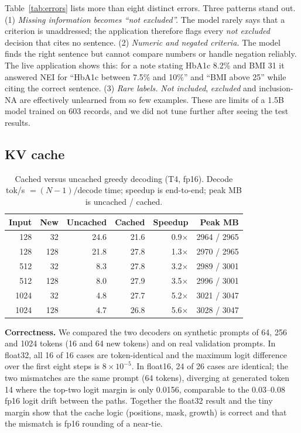\documentclass[conference]{IEEEtran}
\begin{document}
Table~\ref{tab:errors} lists more than eight distinct errors. Three patterns stand out. (1) \emph{Missing information becomes ``not excluded''.} The model rarely says that a criterion is unaddressed; the application therefore flags every \emph{not excluded} decision that cites no sentence. (2) \emph{Numeric and negated criteria.} The model finds the right sentence but cannot compare numbers or handle negation reliably. The live application shows this: for a note stating HbA1c 8.2\% and BMI 31 it answered NEI for ``HbA1c between 7.5\% and 10\%'' and ``BMI above 25'' while citing the correct sentence. (3) \emph{Rare labels.} \emph{Not included}, \emph{excluded} and inclusion-NA are effectively unlearned from so few examples. These are limits of a 1.5B model trained on 603 records, and we did not tune further after seeing the test results.

\subsection{KV cache}
\begin{table}[t]
\centering\footnotesize
\caption{Cached versus uncached greedy decoding (T4, fp16). Decode tok/s $=(N-1)/$decode time; speedup is end-to-end; peak MB is uncached / cached.}
\label{tab:kv}
\begin{tabular}{rrrrrr}\toprule
Input & New & Uncached & Cached & Speedup & Peak MB\\\midrule
128 & 32 & 24.6 & 21.6 & 0.9$\times$ & 2964 / 2965\\
128 & 128 & 21.8 & 27.8 & 1.3$\times$ & 2970 / 2965\\
512 & 32 & 8.3 & 27.8 & 3.2$\times$ & 2989 / 3001\\
512 & 128 & 8.0 & 27.9 & 3.5$\times$ & 2996 / 3001\\
1024 & 32 & 4.8 & 27.7 & 5.2$\times$ & 3021 / 3047\\
1024 & 128 & 4.7 & 26.8 & 5.6$\times$ & 3028 / 3047\\\bottomrule
\end{tabular}
\end{table}
\textbf{Correctness.} We compared the two decoders on synthetic prompts of 64, 256 and 1024 tokens (16 and 64 new tokens) and on real validation prompts. In float32, all 16 of 16 cases are token-identical and the maximum logit difference over the first eight steps is $8\times10^{-5}$. In float16, 24 of 26 cases are identical; the two mismatches are the same prompt (64 tokens), diverging at generated token 14 where the top-two logit margin is only 0.0156, comparable to the 0.03--0.08 fp16 logit drift between the paths. Together the float32 result and the tiny margin show that the cache logic (positions, mask, growth) is correct and that the mismatch is fp16 rounding of a near-tie.
\end{document}
